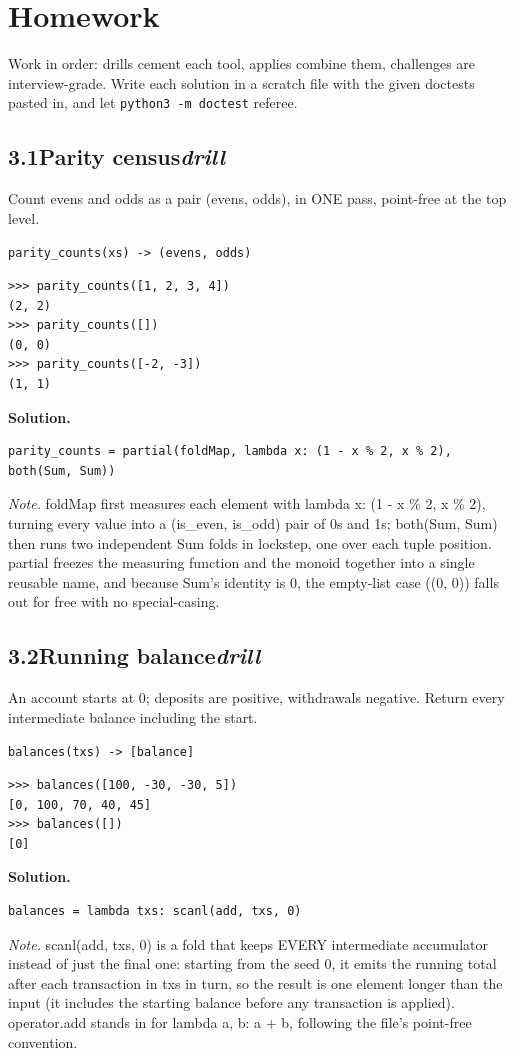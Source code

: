 \documentclass[10pt,letterpaper]{book}
\begin{document}
\section{Homework}
Work in order: drills cement each tool, applies combine them,
challenges are interview-grade. Write each solution in a scratch file with
the given doctests pasted in, and let \texttt{python3 -m doctest} referee.
\subsection*{3.1\quad Parity census\hfill\textnormal{\textit{drill}}}
Count evens and odds as a pair (evens, odds), in ONE pass, point-free at the top level.

\noindent\texttt{parity\_counts(xs) -> (evens, odds)}
\begin{lstlisting}[style=ex]
>>> parity_counts([1, 2, 3, 4])
(2, 2)
>>> parity_counts([])
(0, 0)
>>> parity_counts([-2, -3])
(1, 1)
\end{lstlisting}
\noindent\textbf{Solution.}
\begin{lstlisting}[style=code]
parity_counts = partial(foldMap, lambda x: (1 - x % 2, x % 2), both(Sum, Sum))
\end{lstlisting}
\noindent\textit{Note.} foldMap first measures each element with lambda x: (1 - x \% 2, x \% 2), turning every value into a (is\_even, is\_odd) pair of 0s and 1s; both(Sum, Sum) then runs two independent Sum folds in lockstep, one over each tuple position. partial freezes the measuring function and the monoid together into a single reusable name, and because Sum's identity is 0, the empty-list case ((0, 0)) falls out for free with no special-casing.

\subsection*{3.2\quad Running balance\hfill\textnormal{\textit{drill}}}
An account starts at 0; deposits are positive, withdrawals negative. Return every intermediate balance including the start.

\noindent\texttt{balances(txs) -> [balance]}
\begin{lstlisting}[style=ex]
>>> balances([100, -30, -30, 5])
[0, 100, 70, 40, 45]
>>> balances([])
[0]
\end{lstlisting}
\noindent\textbf{Solution.}
\begin{lstlisting}[style=code]
balances = lambda txs: scanl(add, txs, 0)
\end{lstlisting}
\noindent\textit{Note.} scanl(add, txs, 0) is a fold that keeps EVERY intermediate accumulator instead of just the final one: starting from the seed 0, it emits the running total after each transaction in txs in turn, so the result is one element longer than the input (it includes the starting balance before any transaction is applied). operator.add stands in for lambda a, b: a + b, following the file's point-free convention.
\end{document}
